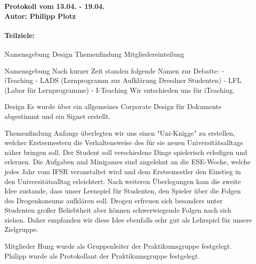 \documentclass[a4paper,10pt]{article}
\begin{document}
\vspace*{1cm}

{\bfseries \large Protokoll vom 13.04. - 19.04. \\[1mm]		%
\normalfont Autor: Philipp Plotz}					%

\vspace{2cm}

\paragraph{Teilziele:}								%
Namensgebung
Design
Themenfindung
Mitgliedereinteilung

\vspace{2cm}

Namensgebung
Nach kurzer Zeit standen folgende Namen zur Debatte:
- iTeaching
- LADS (Lernprogramm zur Aufklärung Dresdner Studenten)
- LFL (Labor für Lernprogramme)
- I-Teaching
Wir entschieden uns für iTeaching.

Design
Es wurde über ein allgemeines Corporate Design für Dokumente abgestimmt und ein Signet erstellt.

Themenfindung
Anfangs überlegten wir uns einen "Uni-Knigge" zu erstellen, welcher Erstsemestern die Verhaltensweise des für sie neuen Universitätsalltags näher bringen soll. Der Student soll verschiedene Dinge spielerisch erledigen und erlernen. Die Aufgaben und Minigames sind angelehnt an die ESE-Woche, welche jedes Jahr vom IFSR veranstaltet wird und dem Erstsemestler den Einstieg in den Universitätsalltag erleichtert.
Nach weiteren Überlegungen kam die zweite Idee zustande, dass unser Lernspiel für Studenten, den Spieler über die Folgen des Drogenkonsums aufklären soll. Drogen erfreuen sich besonders unter Studenten großer Beliebtheit aber können schwerwiegende Folgen nach sich ziehen. Daher empfanden wir diese Idee ebenfalls sehr gut als Lehrspiel für unsere Zielgruppe.

Mitglieder
Hung wurde als Gruppenleiter der Praktikumsgruppe festgelegt.
Philipp wurde als Protokollant der Praktikumsgruppe festgelegt.
\end{document}
